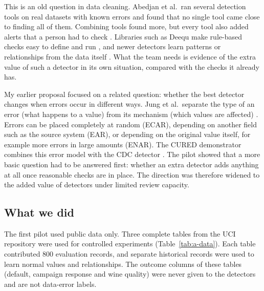 \documentclass[11pt,a4paper]{article}
\begin{document}
This is an old question in data cleaning. Abedjan et al.\ ran several detection tools on real datasets with known errors and found that no single tool came close to finding all of them. Combining tools found more, but every tool also added alerts that a person had to check \cite{abedjan}. Libraries such as Deequ make rule-based checks easy to define and run \cite{deequ}, and newer detectors learn patterns or relationships from the data itself \cite{cdc,lucario,riolu,autotest}. What the team needs is evidence of the extra value of such a detector in its own situation, compared with the checks it already has.

My earlier proposal focused on a related question: whether the best detector changes when errors occur in different ways. Jung et al.\ separate the type of an error (what happens to a value) from its mechanism (which values are affected) \cite{taberr}. Errors can be placed completely at random (ECAR), depending on another field such as the source system (EAR), or depending on the original value itself, for example more errors in large amounts (ENAR). The CURED demonstrator combines this error model with the CDC detector \cite{cured,cdc}. The pilot showed that a more basic question had to be answered first: whether an extra detector adds anything at all once reasonable checks are in place. The direction was therefore widened to the added value of detectors under limited review capacity.

\subsection{What we did}

The first pilot used public data only. Three complete tables from the UCI repository were used for controlled experiments (Table~\ref{tab:a-data}). Each table contributed 800 evaluation records, and separate historical records were used to learn normal values and relationships. The outcome columns of these tables (default, campaign response and wine quality) were never given to the detectors and are not data-error labels.
\end{document}
